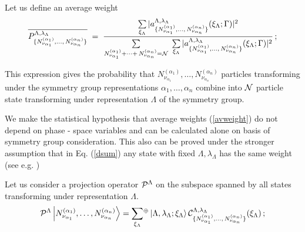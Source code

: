 \documentclass[a4paper,11pt]{article}
\begin{document}
Let us define an average weight
\begin{equation}\label{avweight}
\overline{P^{\Lambda,\lambda_{\Lambda}}_{\{N^{(\alpha_1)}_{\nu_{\alpha_1}},
\dots,\,N^{(\alpha_n)}_{\nu_{\alpha_n}}\}}}\;=\;
\frac{\sum\limits_{\xi_\Lambda}\vert a^{\Lambda,
\lambda_{\Lambda}}_{\{N^{(\alpha_1)}_{\nu_{\alpha_1}},
\dots,\,N^{(\alpha_n)}_{\nu_{\alpha_n}}\}}(\xi_{\Lambda};\Gamma)\vert^2}
{\sum\limits_{N^{(\alpha_1)}_{\nu_{\alpha_1}}+
\cdots+\,N^{(\alpha_n)}_{\nu_{\alpha_n}}={\cal N}}\;
\sum\limits_{\xi_\Lambda}\vert
a^{\Lambda,\lambda_{\Lambda}}_{\{N^{(\alpha_1)}_{\nu_{\alpha_1}},
\dots,\,N^{(\alpha_n)}_{\nu_{\alpha_n}}\}}(\xi_{\Lambda};\Gamma)\vert^2}\,;
\end{equation}

This expression gives the probability that
$N^{(\alpha_1)}_{\nu_{\alpha_1}},\dots, N^{(\alpha_n)}_{
\nu_{\alpha_n}}$ particles transforming under the symmetry group
representations $\alpha_1,\dots,\alpha_n$ combine into $\cal N$
particle state transforming under representation $\Lambda$ of the
symmetry group.

We make the statistical hypothesis that average weights
(\ref{avweight}) do not depend on phase - space variables and can
be calculated alone on basis of symmetry group consideration. This
also can be proved under the stronger assumption that in Eq.
(\ref{dsum}) any state with fixed $\Lambda, \lambda_\Lambda$ has
the same weight (see e.g. \cite{Cerul})

Let us consider a projection operator ${\cal P}^{\Lambda}$ on the
subspace spanned by all states transforming under representation
$\Lambda$.
\begin{equation} \label{proj1states}
{\cal P}^{\Lambda}\left\vert
N^{(\alpha_1)}_{\nu_{\alpha_1}},\dots,
N^{(\alpha_n)}_{\nu_{\alpha_n}}\right\rangle=\sum_{\xi_{\Lambda}}\!^{\oplus}
\left\vert \Lambda, \lambda_{\Lambda};\xi_\Lambda\right\rangle
 {\cal C}^{\Lambda,\lambda_{\Lambda}}_{\{N^{(\alpha_1)}_{\nu_{\alpha_1}},
\dots,\,N^{(\alpha_n)}_{\nu_{\alpha_n}}\}}(\xi_\Lambda)\,;
\end{equation}
\end{document}
